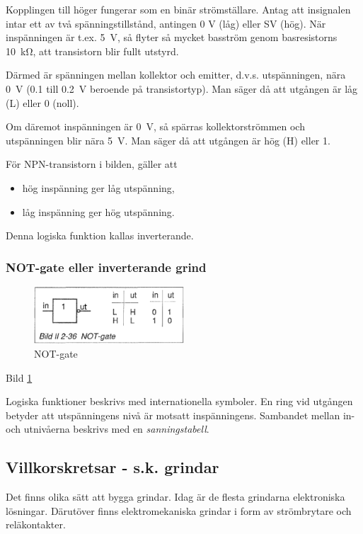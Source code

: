 Kopplingen till höger fungerar som en binär strömställare. Antag att insignalen
intar ett av två spänningstillstånd, antingen 0 V (låg) eller SV (hög). När
inspänningen är t.ex. 5~V, så flyter så mycket basström genom basresistorns
10~kΩ, att transistorn blir fullt utstyrd.

Därmed är spänningen mellan kollektor och emitter, d.v.s. utspänningen, nära 0~V
(0.1 till 0.2~V beroende på transistortyp). Man säger då att utgången är låg (L)
eller 0 (noll).

Om däremot inspänningen är 0~V, så spärras kollektorströmmen och utspänningen
blir nära 5~V. Man säger då att utgången är hög (H) eller 1.

För NPN-transistorn i bilden, gäller att
\begin{itemize}
\item hög inspänning ger låg utspänning,
\item låg inspänning ger hög utspänning.
\end{itemize}
Denna logiska funktion kallas inverterande.

\subsubsection{NOT-gate eller inverterande grind}

\begin{figure}
\includegraphics[width=0.5\textwidth]{images/bild_2_2-36}
\caption{NOT-gate}
\label{fig:BildII2-36}
\end{figure}

Bild \ref{fig:BildII2-36}

Logiska funktioner beskrivs med internationella symboler. En ring vid utgången
betyder att utspänningens nivå är motsatt inspänningens. Sambandet mellan in-
och utnivåerna beskrivs med en \emph{sanningstabell}.

\subsection{Villkorskretsar - s.k. grindar}

Det finns olika sätt att bygga grindar. Idag är de flesta grindarna elektroniska
lösningar. Därutöver finns elektromekaniska grindar i form av strömbrytare och
reläkontakter.

